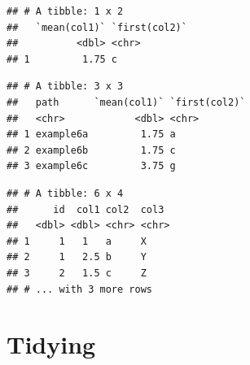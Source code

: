 \documentclass[]{book}
\newenvironment{Shaded}{}{}
\newcommand{\KeywordTok}[1]{\textcolor[rgb]{0.00,0.00,1.00}{#1}}
\newcommand{\NormalTok}[1]{#1}
\newcommand{\OperatorTok}[1]{#1}
\newcommand{\StringTok}[1]{\textcolor[rgb]{0.00,0.50,0.50}{#1}}
\begin{document}
\begin{Shaded}
\end{Shaded}

\begin{verbatim}
## # A tibble: 1 x 2
##   `mean(col1)` `first(col2)`
##          <dbl> <chr>        
## 1         1.75 c
\end{verbatim}

\begin{Shaded}
\end{Shaded}

\begin{verbatim}
## # A tibble: 3 x 3
##   path      `mean(col1)` `first(col2)`
##   <chr>            <dbl> <chr>        
## 1 example6a         1.75 a            
## 2 example6b         1.75 c            
## 3 example6c         3.75 g
\end{verbatim}

\begin{Shaded}
\end{Shaded}

\begin{verbatim}
## # A tibble: 6 x 4
##      id  col1 col2  col3 
##   <dbl> <dbl> <chr> <chr>
## 1     1   1   a     X    
## 2     1   2.5 b     Y    
## 3     2   1.5 c     Z    
## # ... with 3 more rows
\end{verbatim}

\hypertarget{tidying}{%
\chapter{Tidying}\label{tidying}}
\end{document}
